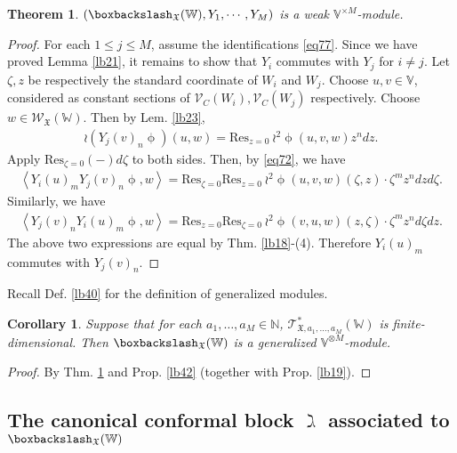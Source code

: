 \documentclass[11pt,b5paper,notitlepage]{article}
\theoremstyle{definition}
\theoremstyle{plain}
\newtheorem{thm}[df]{Theorem}
\newtheorem{co}[df]{Corollary}
\newcommand{\fk}{\mathfrak}
\newcommand{\Res}{\mathrm{Res}}
\newcommand{\SV}{\mathscr{V}}
\newcommand{\scr}{\mathscr}
\newcommand{\Vbb}{\mathbb V}
\newcommand{\Wbb}{\mathbb W}
\newcommand{\Nbb}{\mathbb N}
\newcommand{\<}{\left\langle}
\renewcommand{\>}{\right\rangle}
\newcommand{\fx}{\mathfrak{X}}
\newcommand{\bbs}{\boxbackslash}
\numberwithin{equation}{subsection}
\begin{document}
\begin{thm}\label{lb43}
    $(\boxbackslash_\fx(\Wbb),Y_1,\cdots,Y_M)$ is a weak $\Vbb^{\times M}$-module.
\end{thm}
\begin{proof}
For each $1\leq j\leq M$, assume the identifications \eqref{eq77}.   Since we have proved Lemma \ref{lb21},  it remains to show that $Y_i$ commutes with $Y_j$ for $i\ne j$. Let $\zeta,z$ be respectively the standard coordinate of $W_i$ and $W_j$. Choose $u,v\in \Vbb$, considered as constant sections of $\SV_C(W_i),\SV_C(W_j)$ respectively. Choose $w\in\scr W_{\fk X}(\Wbb)$. Then by Lem. \ref{lb23},
\begin{align*}
\wr(Y_j(v)_n\upphi)(u,w)=\Res_{z=0}~{\wr^2\upphi}(u,v,w)z^n dz.
\end{align*}
Apply $\Res_{\zeta=0}(-)d\zeta$ to both sides.  Then, by \eqref{eq72}, we have
\begin{align}
\<Y_i(u)_mY_j(v)_n\upphi,w\>=\Res_{\zeta=0}\Res_{z=0}~{\wr^2 \upphi}(u,v,w)(\zeta,z)\cdot \zeta^m z^n dzd\zeta.
\end{align}
    Similarly, we have
\begin{align*}
\<Y_j(v)_nY_i(u)_m\upphi,w\>=\Res_{z=0}\Res_{\zeta=0}~{\wr^2 \upphi}(v,u,w)(z,\zeta)\cdot \zeta^m z^n d\zeta dz.
\end{align*}
The above two expressions are equal by Thm. \ref{lb18}-(4). Therefore $Y_i(u)_m$ commutes with $Y_j(v)_n$.
\end{proof}




Recall Def. \ref{lb40} for the definition of generalized modules. 

\begin{co}\label{lb44}
Suppose that for each $a_1,\dots,a_M\in\Nbb$, $\scr T_{\fk X,a_1,\dots,a_M}^*(\Wbb)$ is finite-dimensional. Then $\bbs_\fx(\Wbb)$ is a generalized $\Vbb^{\otimes M}$-module.
\end{co}

\begin{proof}
By Thm. \ref{lb43} and Prop. \ref{lb42} (together with Prop. \ref{lb19}).
\end{proof}










\subsection{The canonical conformal block $\gimel$ associated to $\boxbackslash_{\fx}(\Wbb)$}  \label{lb58}
\end{document}
